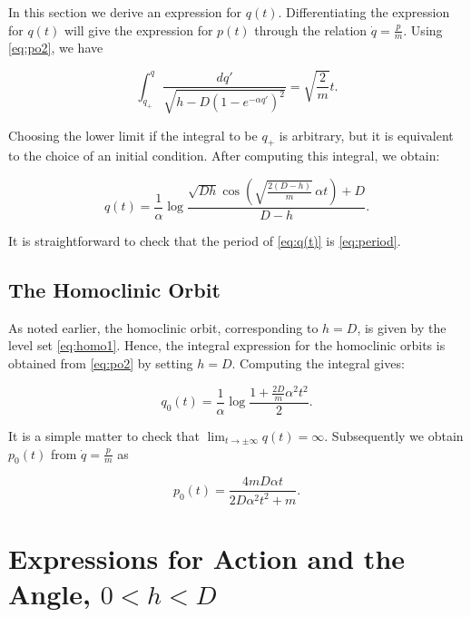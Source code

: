 \documentclass{ws-ijbc}
\begin{document}
In this section we derive an expression for $q(t)$. Differentiating the expression for $q(t)$ will give the expression for $p(t)$ through the relation $\dot{q} = \frac{p}{m}$. Using \eqref{eq:po2}, we have

\begin{equation}
\int_{q_+}^q \frac{dq'}{ \sqrt{h-D \left( 1-e^{-\alpha q'} \right)^2}} =  \sqrt{\frac{2}{m}} t.
\label{eq:traj1}
\end{equation}

\noindent
Choosing  the lower limit if the integral to be $q_+$ is arbitrary, but it is equivalent to the  choice of an initial condition. After computing this integral, we obtain:


\begin{equation}
q(t) = \frac{1}{\alpha} \log{\frac{\sqrt{Dh} \cos \left(\sqrt{\frac{2(D-h)}{m}} \, \alpha t \right) + D}{D-h}}.
\label{eq:q(t)}
\end{equation}

\noindent
It is straightforward to check that the period of \eqref{eq:q(t)} is \eqref{eq:period}.

\subsection{The Homoclinic Orbit}
\label{sec:homo}

As noted earlier, the homoclinic orbit, corresponding to $h=D$, is given by the level set
\eqref{eq:homo1}. Hence, the integral expression for  the homoclinic orbits is obtained from \eqref{eq:po2} by setting $h=D$.  Computing the integral gives:

\begin{equation}
q_0(t) = \frac{1}{\alpha} \log{\frac{1 + \frac{2D}{m} \alpha^2 t^2}{2}}.
\label{eq:qhom}
\end{equation}

\noindent
It is a simple matter to check that $\lim_{t \rightarrow \pm \infty} q(t) = \infty$. Subsequently we obtain $p_0(t)$ from $\dot{q}=\frac{p}{m}$ as

\begin{equation}
p_0(t) = \frac{4mD\alpha t}{2D\alpha^2 t^2+m}.
\label{eq:phom}
\end{equation}


\section{Expressions for Action and the Angle, $0 < h < D$}
\label{sec:AA}
\end{document}
